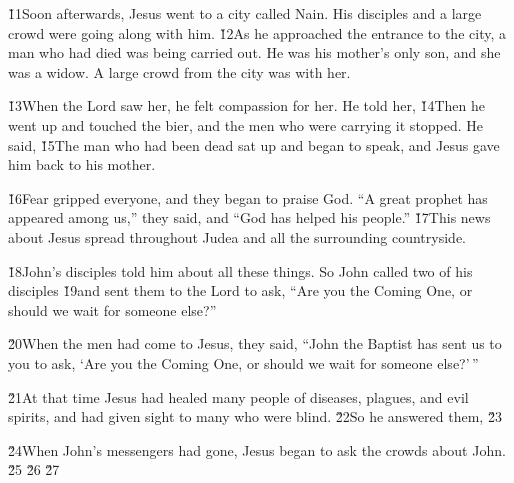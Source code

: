 \v{11}Soon afterwards, Jesus went to a city called Nain. His disciples and a large crowd were going along with him. \v{12}As he approached the entrance to the city, a man who had died was being carried out. He was his mother's only son, and she was a widow. A large crowd from the city was with her.

\v{13}When the Lord saw her, he felt compassion for her. He told her,  \v{14}Then he went up and touched the bier, and the men who were carrying it stopped. He said,  \v{15}The man who had been dead sat up and began to speak, and Jesus gave him back to his mother.

\v{16}Fear gripped everyone, and they began to praise God. ``A great prophet has appeared among us,'' they said, and ``God has helped his people.'' \v{17}This news about Jesus spread throughout Judea and all the surrounding countryside.

\v{18}John's disciples told him about all these things. So John called two of his disciples \v{19}and sent them to the Lord to ask, ``Are you the Coming One, or should we wait for someone else?''

\v{20}When the men had come to Jesus, they said, ``John the Baptist has sent us to you to ask, `Are you the Coming One, or should we wait for someone else?'\,''

\v{21}At that time Jesus had healed many people of diseases, plagues, and evil spirits, and had given sight to many who were blind. \v{22}So he answered them,  \v{23}

\v{24}When John's messengers had gone, Jesus began to ask the crowds about John.  \v{25} \v{26} \v{27}

